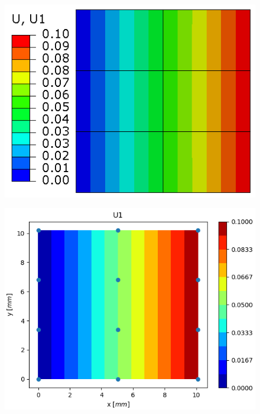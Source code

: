\documentclass[11pt]{article}
\begin{document}
\begin{figure}[H]
	\centering
	\begin{minipage}{.5\textwidth}
		\centering
		\includegraphics[width=1\linewidth]{EM23U1.png}
		\label{EM23U1}
	\end{minipage}%
	\begin{minipage}{.5\textwidth}
		\centering
		\includegraphics[width=1\linewidth]{EM23U1_IGA.png}
		\label{EM23U1_IGA}
	\end{minipage}
\end{figure}
\end{document}
